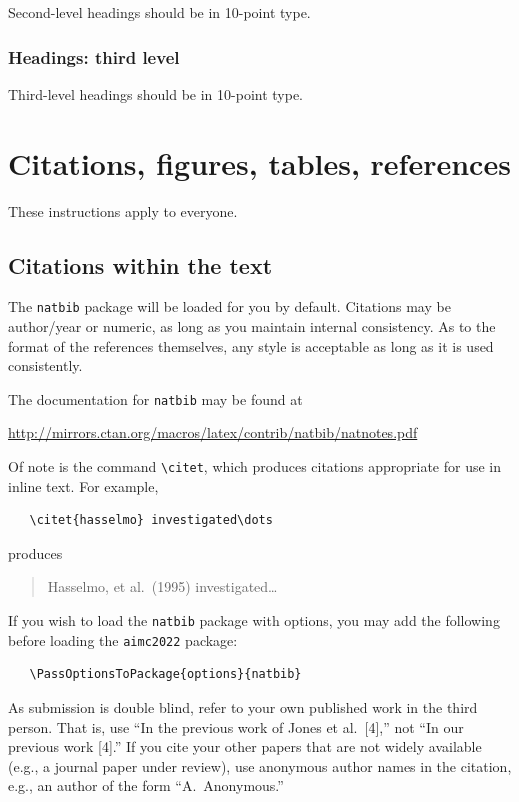 \documentclass{article}
\begin{document}
Second-level headings should be in 10-point type.

\subsubsection{Headings: third level}

Third-level headings should be in 10-point type.


\section{Citations, figures, tables, references}
\label{others}

These instructions apply to everyone.

\subsection{Citations within the text}

The \verb+natbib+ package will be loaded for you by default.  Citations may be
author/year or numeric, as long as you maintain internal consistency.  As to the
format of the references themselves, any style is acceptable as long as it is
used consistently.

The documentation for \verb+natbib+ may be found at
\begin{center}
  \url{http://mirrors.ctan.org/macros/latex/contrib/natbib/natnotes.pdf}
\end{center}
Of note is the command \verb+\citet+, which produces citations appropriate for
use in inline text.  For example,
\begin{verbatim}
   \citet{hasselmo} investigated\dots
\end{verbatim}
produces
\begin{quote}
  Hasselmo, et al.\ (1995) investigated\dots
\end{quote}

If you wish to load the \verb+natbib+ package with options, you may add the
following before loading the \verb+aimc2022+ package:
\begin{verbatim}
   \PassOptionsToPackage{options}{natbib}
\end{verbatim}

As submission is double blind, refer to your own published work in the third
person. That is, use ``In the previous work of Jones et al.\ [4],'' not ``In our
previous work [4].'' If you cite your other papers that are not widely available
(e.g., a journal paper under review), use anonymous author names in the
citation, e.g., an author of the form ``A.\ Anonymous.''
\end{document}
